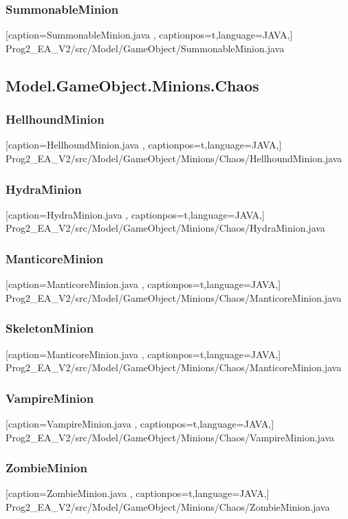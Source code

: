 \documentclass[a4paper,12pt]{scrartcl}
\begin{document}
	\subsubsection{SummonableMinion}
	
	[caption={SummonableMinion.java}
	\label{lst:javaclass},
	captionpos=t,language=JAVA,]
	{Prog2_EA_V2/src/Model/GameObject/SummonableMinion.java}
	\subsection{Model.GameObject.Minions.Chaos}
	\subsubsection{HellhoundMinion}
	
	[caption={HellhoundMinion.java}
	\label{lst:javaclass},
	captionpos=t,language=JAVA,]
	{Prog2_EA_V2/src/Model/GameObject/Minions/Chaos/HellhoundMinion.java}
	\subsubsection{HydraMinion}
	
	[caption={HydraMinion.java}
	\label{lst:javaclass},
	captionpos=t,language=JAVA,]
	{Prog2_EA_V2/src/Model/GameObject/Minions/Chaos/HydraMinion.java}
	\subsubsection{ManticoreMinion}
	
	[caption={ManticoreMinion.java}
	\label{lst:javaclass},
	captionpos=t,language=JAVA,]
	{Prog2_EA_V2/src/Model/GameObject/Minions/Chaos/ManticoreMinion.java}
	\subsubsection{SkeletonMinion}
	
	[caption={ManticoreMinion.java}
	\label{lst:javaclass},
	captionpos=t,language=JAVA,]
	{Prog2_EA_V2/src/Model/GameObject/Minions/Chaos/ManticoreMinion.java}
	\subsubsection{VampireMinion}
	
	[caption={VampireMinion.java}
	\label{lst:javaclass},
	captionpos=t,language=JAVA,]
	{Prog2_EA_V2/src/Model/GameObject/Minions/Chaos/VampireMinion.java}
	\subsubsection{ZombieMinion}
	
	[caption={ZombieMinion.java}
	\label{lst:javaclass},
	captionpos=t,language=JAVA,]
	{Prog2_EA_V2/src/Model/GameObject/Minions/Chaos/ZombieMinion.java}
\end{document}
